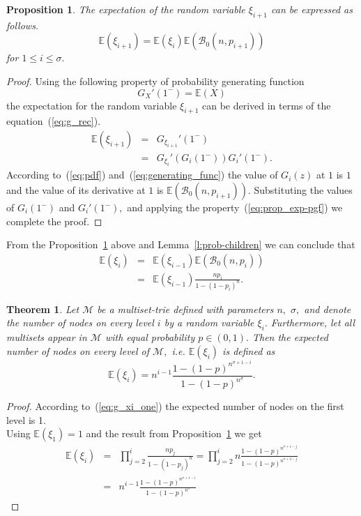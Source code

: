 \documentclass[10pt,letterpaper]{article}
\newtheorem{theorem}{Theorem}
\newtheorem{proposition}{Proposition}
\begin{document}
\begin{proposition}\label{prop:exp_rec}
The expectation of the random variable $\xi_{i+1}$ can be expressed 
as follows.
\[
\mathbb{E}(\xi_{i+1}) = \mathbb{E}(\xi_i)\mathbb{E}(\mathcal{B}_0(n,p_{i+1}))
\]
for $1\leq i\leq\sigma.$
\end{proposition}
\begin{proof}
Using the following property of probability generating function
\begin{equation}\label{eq:prop_exp-pgf}
G_X'(1^-) = \mathbb{E}(X)
\end{equation}
the expectation for the random variable $\xi_{i+1}$ can be derived in terms of 
the equation~(\cref{eq:g_rec}).
\begin{eqnarray}\label{eq:exp}
\mathbb{E}(\xi_{i+1}) &=& G_{\xi_{i+1}}'(1^-) \nonumber \\
&=& G_{\xi_i}'(G_i(1^-))G_i'(1^-).
\end{eqnarray}
According to~(\cref{eq:pdf}) and~(\cref{eq:generating_func}) the value of $G_i(z)$ at 
$1$ is $1$ and the value of its derivative at $1$ is $\mathbb{E}(\mathcal{B}_0(n,p_{i+1})).$ 
Substituting the values of $G_i(1^-)$ and $G_i'(1^-),$ and applying the 
property~(\cref{eq:prop_exp-pgf}) we complete the proof.

\end{proof}
%
From the Proposition~\ref{prop:exp_rec} above and Lemma~\ref{l:prob-children} we 
can conclude that 
\begin{eqnarray}
\mathbb{E}(\xi_{i}) &=& \mathbb{E}(\xi_{i-1})\mathbb{E}\left( \mathcal{B}_0(n,p_{i}) \right) \nonumber \\
& = & \mathbb{E}(\xi_{i-1})\frac{np_{i}}{1-(1-p_{i})^n}.
\end{eqnarray}

\begin{theorem}\label{thm:exp_level}
Let $\mathcal{M}$ be a multiset-trie defined with parameters $n,$ $\sigma,$ and denote the number 
of nodes on every level $i$ by a random variable $\xi_i.$ Furthermore, let all multisets appear in 
$\mathcal{M}$ with equal probability $p\in (0,1).$ Then the expected number 
of nodes on every level of $\mathcal{M},$ i.e. $\mathbb{E}(\xi_i)$ is defined as 
\begin{equation}\label{eq:nodes_level}
\mathbb{E}(\xi_{i}) = n^{i-1} \frac{1-(1-p)^{n^{\sigma +1 -i}}}{1-(1-p)^{n^{\sigma}}}.
\end{equation}
\end{theorem}
\begin{proof}
According to~(\cref{eq:g_xi_one}) the expected number of nodes on the first level is 1. \\
Using $\mathbb{E}(\xi_1) = 1$ and the result from Proposition~\ref{prop:exp_rec}
we get
\begin{eqnarray*}
\mathbb{E}(\xi_{i}) &=& \prod_{j=2}^{i} \frac{n p_j}{1-(1-p_j)^n}
= \prod_{j=2}^{i} n \frac{1-(1-p)^{n^{\sigma +1-j}}}{1-(1-p)^{n^{\sigma + 2 -j}}} \\
&=& n^{i-1} \frac{1-(1-p)^{n^{\sigma +1 -i}}}{1-(1-p)^{n^{\sigma}}}
\end{eqnarray*}

\end{proof}
\end{document}
